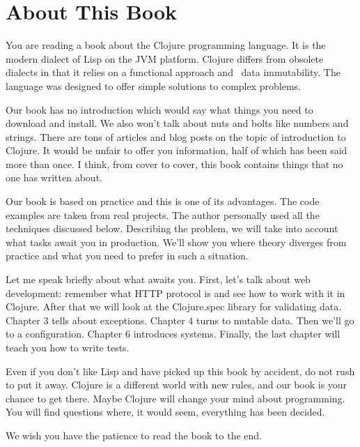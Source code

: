 
\section*{About This Book}

You are reading a book about the Clojure programming language. It is the modern
dialect of Lisp on the JVM platform.  Clojure differs from obsolete dialects in
that it relies on a functional approach and ~data immutability.  The language
was designed to offer simple solutions to complex problems.


Our book has no introduction which would say what things you need to download and install.
We also won't talk about nuts and bolts like numbers and strings.
There are tons of articles and blog posts on the topic of introduction to Clojure.
It would be unfair to offer you information, half of which has been said more than once.
I think, from cover to cover, this book contains things that no one has written about.

Our book is based on practice and this is one of its advantages. The code examples are taken from real projects.
The author personally used all the techniques discussed below. Describing the problem, we will take into account what tasks await you in production.
We'll show you where theory diverges from practice and what you need to prefer in such a situation.

Let me speak briefly about what awaits you. First, let's talk about web development: remember what HTTP protocol is and see how to work with it in Clojure.
After that we will look at the Clojure.spec library for validating data.
Chapter 3 tells about exceptions. Chapter 4 turns to mutable data.
Then we'll go to a configuration. Chapter 6 introduces systems. Finally, the last chapter will teach you how to write tests.

Even if you don't like Lisp and have picked up this book by accident, do not rush to put it away.
Clojure is a different world with new rules, and our book is your chance to get there.
Maybe Clojure will change your mind about programming. You will find questions where, it would seem, everything has been decided.

We wish you have the patience to read the book to the end.

